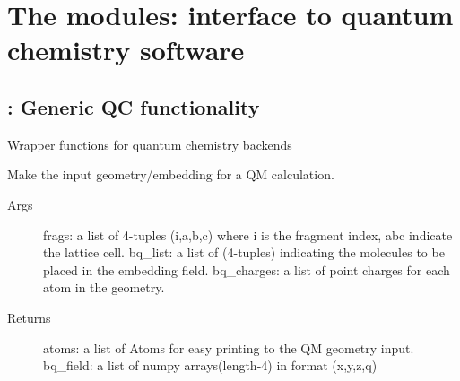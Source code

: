 \documentclass[letterpaper,10pt,english]{sphinxmanual}
\begin{document}
\section{The  modules: interface to quantum chemistry software}
\label{\detokenize{backend:the-backend-modules-interface-to-quantum-chemistry-software}}\label{\detokenize{backend::doc}}

\subsection{: Generic QC functionality}
\label{\detokenize{backend:backend-generic-qc-functionality}}\label{\detokenize{backend:module-backend.backend}}
Wrapper functions for quantum chemistry backends

\begin{fulllineitems}
\label{\detokenize{backend:backend.backend.build_atoms}}
Make the input geometry/embedding for a QM calculation.
\begin{description}
\item[{Args}] \leavevmode
frags: a list of 4-tuples (i,a,b,c) where i is the fragment index,
abc indicate the lattice cell.
bq\_list: a list of (4-tuples) indicating the molecules to be placed in
the embedding field.
bq\_charges: a list of point charges for each atom in the geometry.

\item[{Returns}] \leavevmode
atoms: a list of Atoms for easy printing to the QM \sphinxquotedblleft{}geometry\sphinxquotedblright{} input.
bq\_field: a list of numpy arrays(length-4) in format (x,y,z,q)

\end{description}

\end{fulllineitems}

\end{document}
